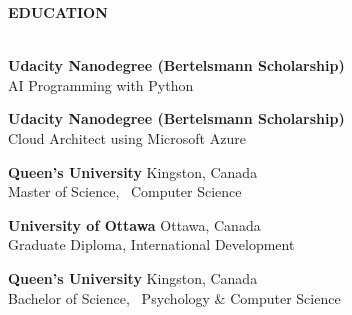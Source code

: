 \documentclass[letterpaper]{article}
\newcommand{\lineunder} {
        \vspace*{-8pt} \\
        \hspace*{-18pt} \hrulefill \\
    }
\newcommand{\header} [1] {
        \vspace{9pt}
        {\hspace*{-18pt}\vspace*{6pt} \large \textbf {#1}}
        \vspace*{-6pt} \lineunder
        \vspace{2pt}
    }
\newcommand{\university}[3]{
        \textbf{#1}  %
        \hfill #2\\  %
        #3\\         %
        \vspace{2mm}
    }
\begin{document}
\header{EDUCATION}
    \university
        {Udacity Nanodegree (Bertelsmann Scholarship)}
        {}
        {AI Programming with Python}
    \university
        {Udacity Nanodegree (Bertelsmann Scholarship)}
        {}
        {Cloud Architect using Microsoft Azure}
    \university
        {Queen's University}
        {Kingston, Canada}
        {Master of Science, ~Computer Science}

    \university
        {University of Ottawa}
        {Ottawa, Canada}
        {Graduate Diploma, International Development}

    \university
        {Queen's University}
        {Kingston, Canada}
        {Bachelor of Science, ~Psychology \& Computer Science}
\end{document}
